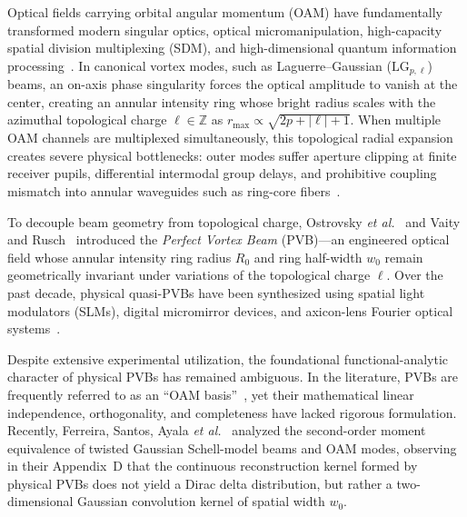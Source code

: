 \documentclass{optica-article}
\begin{document}
Optical fields carrying orbital angular momentum (OAM) have fundamentally transformed modern singular optics, optical micromanipulation, high-capacity spatial division multiplexing (SDM), and high-dimensional quantum information processing~\cite{Allen1992,Durnin1987,Mair2001,Dennis2009,FrankeArnold2008,Berry1998,Berry2004,Barnett2002,Padgett1999,Gbur2016,MandelWolf1995,Siegman1986}. In canonical vortex modes, such as Laguerre--Gaussian ($\text{LG}_{p, \ell}$) beams, an on-axis phase singularity forces the optical amplitude to vanish at the center, creating an annular intensity ring whose bright radius scales with the azimuthal topological charge $\ell \in \mathbb{Z}$ as $r_{\max} \propto \sqrt{2p + |\ell| + 1}$. When multiple OAM channels are multiplexed simultaneously, this topological radial expansion creates severe physical bottlenecks: outer modes suffer aperture clipping at finite receiver pupils, differential intermodal group delays, and prohibitive coupling mismatch into annular waveguides such as ring-core fibers~\cite{Villalba2023,RojasRojas2021,Canas2021,Ramachandran2009,Bozinovic2013,Willner2015,Brunet2014,Gregg2015,Zhu2018,Wang2012}.

To decouple beam geometry from topological charge, Ostrovsky \emph{et al.}~\cite{Ostrovsky2013} and Vaity and Rusch~\cite{Vaity2015} introduced the \emph{Perfect Vortex Beam} (PVB)---an engineered optical field whose annular intensity ring radius $R_0$ and ring half-width $w_0$ remain geometrically invariant under variations of the topological charge $\ell$. Over the past decade, physical quasi-PVBs have been synthesized using spatial light modulators (SLMs), digital micromirror devices, and axicon-lens Fourier optical systems~\cite{Chen2013,Reddy2016,Jabir2016,GarciaGarcia2014,Li2018PVB,PerezGarcia2017,Arrizon2007}.

Despite extensive experimental utilization, the foundational functional-analytic character of physical PVBs has remained ambiguous. In the literature, PVBs are frequently referred to as an ``OAM basis''~\cite{GarciaEscartin2008}, yet their mathematical linear independence, orthogonality, and completeness have lacked rigorous formulation. Recently, Ferreira, Santos, Ayala \emph{et al.}~\cite{Ferreira2026} analyzed the second-order moment equivalence of twisted Gaussian Schell-model beams and OAM modes, observing in their Appendix~D that the continuous reconstruction kernel formed by physical PVBs does not yield a Dirac delta distribution, but rather a two-dimensional Gaussian convolution kernel of spatial width $w_0$.
\end{document}
